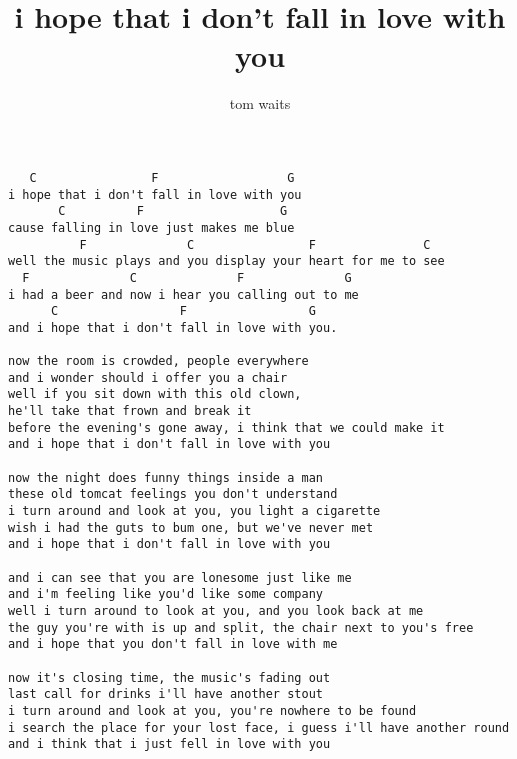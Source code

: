 \author{tom waits}
\title{i hope that i don't fall in love with you}
\maketitle
\begin{verbatim}
   C                F                  G
i hope that i don't fall in love with you
       C          F                   G
cause falling in love just makes me blue
          F              C                F               C
well the music plays and you display your heart for me to see
  F              C              F              G
i had a beer and now i hear you calling out to me
      C                 F                 G
and i hope that i don't fall in love with you.

now the room is crowded, people everywhere
and i wonder should i offer you a chair
well if you sit down with this old clown,
he'll take that frown and break it
before the evening's gone away, i think that we could make it
and i hope that i don't fall in love with you

now the night does funny things inside a man
these old tomcat feelings you don't understand
i turn around and look at you, you light a cigarette
wish i had the guts to bum one, but we've never met
and i hope that i don't fall in love with you

and i can see that you are lonesome just like me
and i'm feeling like you'd like some company
well i turn around to look at you, and you look back at me
the guy you're with is up and split, the chair next to you's free
and i hope that you don't fall in love with me

now it's closing time, the music's fading out
last call for drinks i'll have another stout
i turn around and look at you, you're nowhere to be found
i search the place for your lost face, i guess i'll have another round
and i think that i just fell in love with you
\end{verbatim}